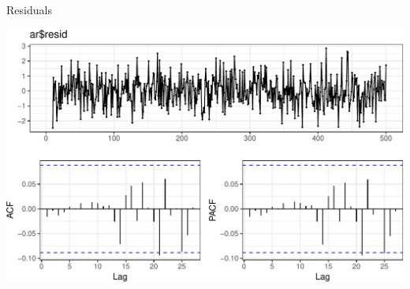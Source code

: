 \documentclass[11pt,ignorenonframetext,]{beamer}
\newenvironment{Shaded}{}{}
\newcommand{\KeywordTok}[1]{\textcolor[rgb]{0.00,0.44,0.13}{\textbf{#1}}}
\newcommand{\NormalTok}[1]{#1}
\newcommand{\OperatorTok}[1]{\textcolor[rgb]{0.40,0.40,0.40}{#1}}
\let\oldShaded\Shaded
\let\endoldShaded\endShaded
\renewenvironment{Shaded}{\footnotesize\begin{spacing}{0.9}\oldShaded}{\endoldShaded\end{spacing}}
\begin{document}
\begin{frame}[fragile]{%
\protect\hypertarget{residuals}{%
Residuals}}

\begin{Shaded}
\end{Shaded}

\begin{center}\includegraphics[width=\textwidth]{Lec10_files/figure-beamer/unnamed-chunk-15-1} \end{center}

\end{frame}
\end{document}
